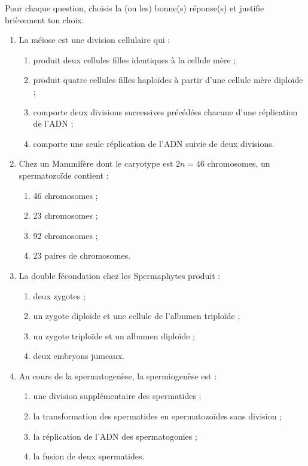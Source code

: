 \documentclass[11pt]{article}
\begin{document}
\begin{exercice}
Pour chaque question, choisis la (ou les) bonne(s) réponse(s) et justifie brièvement ton choix.
\begin{enumerate}
\item La méiose est une division cellulaire qui :
\begin{enumerate}
\item[a)] produit deux cellules filles identiques à la cellule mère ;
\item[b)] produit quatre cellules filles haploïdes à partir d'une cellule mère diploïde ;
\item[c)] comporte deux divisions successives précédées chacune d'une réplication de l'ADN ;
\item[d)] comporte une seule réplication de l'ADN suivie de deux divisions.
\end{enumerate}
\item Chez un Mammifère dont le caryotype est $2n = 46$ chromosomes, un spermatozoïde contient :
\begin{enumerate}
\item[a)] 46 chromosomes ; \item[b)] 23 chromosomes ; \item[c)] 92 chromosomes ; \item[d)] 23 paires de chromosomes.
\end{enumerate}
\item La double fécondation chez les Spermaphytes produit :
\begin{enumerate}
\item[a)] deux zygotes ; \item[b)] un zygote diploïde et une cellule de l'albumen triploïde ; \item[c)] un zygote triploïde et un albumen diploïde ; \item[d)] deux embryons jumeaux.
\end{enumerate}
\item Au cours de la spermatogenèse, la spermiogenèse est :
\begin{enumerate}
\item[a)] une division supplémentaire des spermatides ;
\item[b)] la transformation des spermatides en spermatozoïdes sans division ;
\item[c)] la réplication de l'ADN des spermatogonies ;
\item[d)] la fusion de deux spermatides.
\end{enumerate}
\end{enumerate}
\end{exercice}
\end{document}
